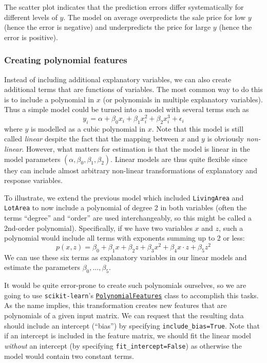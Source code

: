 \documentclass{scrartcl}
\begin{document}
    \begin{center}
    \end{center}
    
    The scatter plot indicates that the prediction errors differ
systematically for different levels of \(y\). The model on average
overpredicts the sale price for low \(y\) (hence the error is negative)
and underpredicts the price for large \(y\) (hence the error is
positive).

    \hypertarget{creating-polynomial-features}{%
\subsubsection{Creating polynomial
features}\label{creating-polynomial-features}}

Instead of including additional explanatory variables, we can also
create additional terms that are functions of variables. The most common
way to do this is to include a polynomial in \(x\) (or polynomials in
multiple explanatory variables). Thus a simple model could be turned
into a model with several terms such as \[
y_i = \alpha + \beta_0 x_i + \beta_1 x_i^2 + \beta_2 x_i^3 + \epsilon_i
\] where \(y\) is modelled as a cubic polynomial in \(x\). Note that
this model is still called \emph{linear} despite the fact that the
mapping between \(x\) and \(y\) is obviously \emph{non-linear}. However,
what matters for estimation is that the model is linear in the model
parameters \((\alpha, \beta_0, \beta_1, \beta_2)\). Linear models are
thus quite flexible since they can include almost arbitrary non-linear
transformations of explanatory and response variables.

    To illustrate, we extend the previous model which included
\texttt{LivingArea} and \texttt{LotArea} to now include a polynomial of
degree 2 in both variables (often the terms ``degree'' and ``order'' are
used interchangeably, so this might be called a 2nd-order polynomial).
Specifically, if we have two variables \(x\) and \(z\), such a
polynomial would include all terms with exponents summing up to 2 or
less: \[
p(x,z) = \beta_0 + \beta_1 x + \beta_2 z + \beta_3 x^2 + \beta_4 x \cdot z + \beta_5 z^2
\] We can use these six terms as explanatory variables in our linear
models and estimate the parameters \(\beta_0,\dots,\beta_5\).

It would be quite error-prone to create such polynomials ourselves, so
we are going to use \texttt{scikit-learn}'s
\href{https://scikit-learn.org/stable/modules/generated/sklearn.preprocessing.PolynomialFeatures.html}{\texttt{PolynomialFeatures}}
class to accomplish this tasks. As the name implies, this transformation
creates new features that are polynomials of a given input matrix. We
can request that the resulting data should include an intercept
(``bias'') by specifying \texttt{include\_bias=True}. Note that if an
intercept is included in the feature matrix, we should fit the linear
model \emph{without} an intercept (by specifying
\texttt{fit\_intercept=False}) as otherwise the model would contain two
constant terms.
\end{document}
